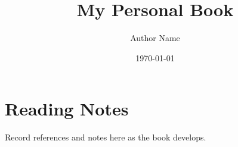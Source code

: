 \documentclass{otbook}
\title{My Personal Book}
\author{Author Name}
\date{\today}
\begin{document}
\hypersetup{pageanchor=false}
\makeotbooktitle
\frontmatter
\hypersetup{pageanchor=true}
\tableofcontents

\mainmatter


% 

\backmatter
\chapter{Reading Notes}
Record references and notes here as the book develops.
\end{document}
